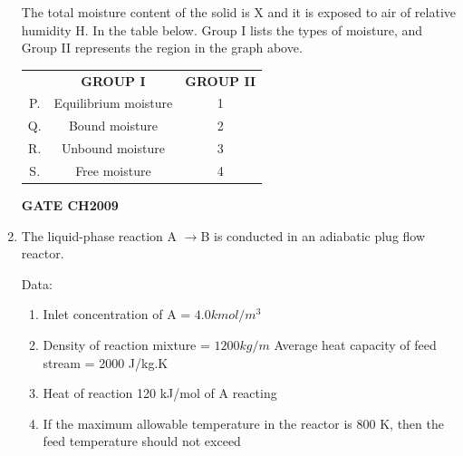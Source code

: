 \documentclass[journal,12pt,onecolumn]{IEEEtran}
\theoremstyle{remark}
\begin{document}
\begin{enumerate}
		
		The total moisture content of the solid is X and it is exposed to air of relative humidity H. In the table below. Group I lists the types of moisture, and Group II represents the region in the graph above. 
		\begin{center}
			\begin{tabular}{ c c c }
				& \textbf{GROUP I} &\textbf{GROUP II} \\
				P. & Equilibrium moisture & 1 \\
				Q. & Bound moisture & 2 \\ 
				R. & Unbound moisture & 3 \\
				S. & Free moisture & 4 
			\end{tabular}
		\end{center}
		\begin{enumerate}
		\end{enumerate} 
		
		\hfill
		\textbf{GATE CH2009} 
		
		
		\item The liquid-phase reaction A $\rightarrow$B is conducted in an adiabatic plug flow reactor.
		
		Data:
		\begin{enumerate}
			\item Inlet concentration of A = $4.0 kmol/m^3$
			\item Density of reaction mixture  = $1200 kg/m$ Average heat capacity of feed stream  = 2000 J/kg.K
			\item Heat of reaction 120 kJ/mol of A reacting
			\item If the maximum allowable temperature in the reactor is 800 K, then the feed temperature  should not exceed
		\end{enumerate} 
		\begin{enumerate}
		\end{enumerate} 
		

\end{enumerate}
\end{document}
